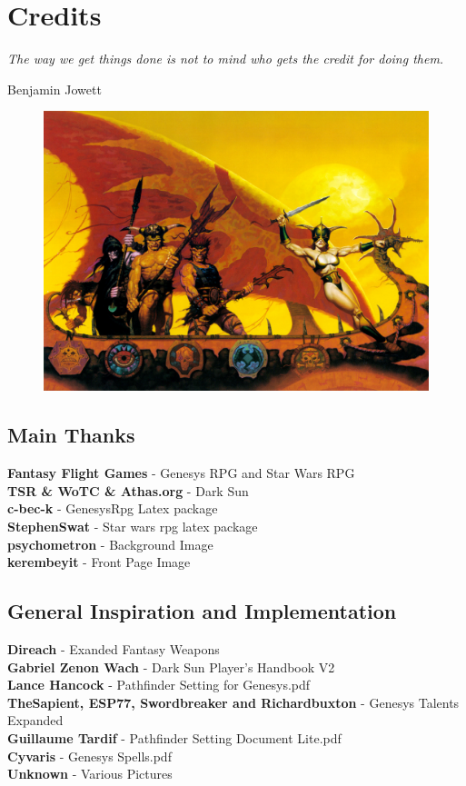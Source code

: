 \chapter{Credits}\label{chap:credits}
\epigraph{\textit{
    The way we get things done is not to mind who gets the credit for doing them.
} }{
    Benjamin Jowett
}

\begin{figure}[H]
\centering
\includegraphics[width=0.4\linewidth]{images/bromdarksun.jpg}
\end{figure}

\section{Main Thanks}
\begin{centering}
\textbf{Fantasy Flight Games} - Genesys RPG and Star Wars RPG\\
\textbf{TSR \& WoTC \& Athas.org} - Dark Sun\\
\textbf{c-bec-k} - GenesysRpg Latex package\\
\textbf{StephenSwat} - Star wars rpg latex package\\
\textbf{psychometron} - Background Image\\
\textbf{kerembeyit} - Front Page Image\\
\end{centering}

\section{General Inspiration and Implementation}
\begin{centering}
\textbf{Direach} - Exanded Fantasy Weapons\\
\textbf{Gabriel Zenon Wach} - Dark Sun Player's Handbook V2\\
\textbf{Lance Hancock} - Pathfinder Setting for Genesys.pdf\\
\textbf{TheSapient, ESP77, Swordbreaker and Richardbuxton} - Genesys Talents Expanded\\
\textbf{Guillaume Tardif} - Pathfinder Setting Document Lite.pdf\\
\textbf{Cyvaris} - Genesys Spells.pdf\\
\textbf{Unknown} - Various Pictures\\
\end{centering}

